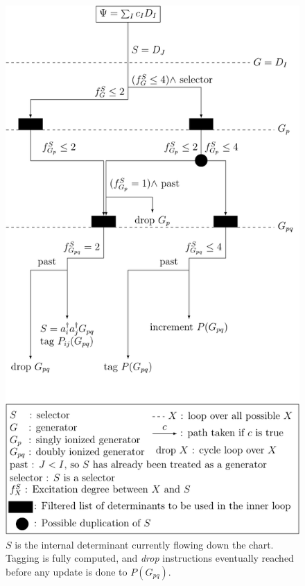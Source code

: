 \documentclass[./thesis.tex]{subfiles}
\begin{document}
\begin{figure}[h!]
	\begin{center}
		\includegraphics[height=0.90\textheight]{figures/cipsi/selection}
	\end{center}
        \caption{$S$ is the internal determinant currently flowing down the chart.
        Tagging is fully computed, and \emph{drop} instructions eventually reached before any update is done to $P(G_{pq})$.}
        \label{fig:selection}	
\end{figure}
\end{document}
